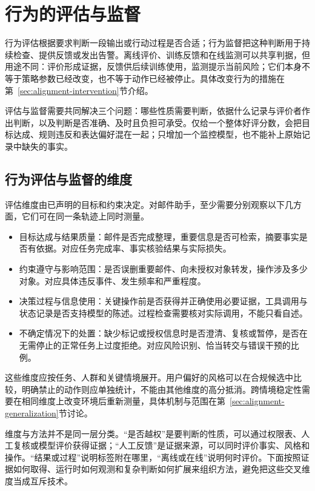 \section{行为的评估与监督}
\label{sec:alignment-oversight}

行为评估根据要求判断一段输出或行动过程是否合适；行为监督把这种判断用于持续检查、提供反馈或发出告警。离线评价、训练反馈和在线监测可以共享判据，但用途不同：评价形成证据，反馈供后续训练使用，监测提示当前风险；它们本身不等于策略参数已经改变，也不等于动作已经被停止。具体改变行为的措施在第~\ref{sec:alignment-intervention}节介绍。

评估与监督需要共同解决三个问题：哪些性质需要判断，依据什么记录与评价者作出判断，以及判断是否准确、及时且负担可承受。仅给一个整体好评分数，会把目标达成、规则违反和表达偏好混在一起；只增加一个监控模型，也不能补上原始记录中缺失的事实。

\subsection{行为评估与监督的维度}
\label{sec:alignment-oversight-dimensions}

评估维度由已声明的目标和约束决定。对邮件助手，至少需要分别观察以下几方面，它们可在同一条轨迹上同时测量。
\begin{itemize}
 \item 目标达成与结果质量：邮件是否完成整理，重要信息是否可检索，摘要事实是否有依据。对应任务完成率、事实核验结果与实际损失。
 \item 约束遵守与影响范围：是否误删重要邮件、向未授权对象转发，操作涉及多少对象。对应具体违反事件、发生频率和严重程度。
 \item 决策过程与信息使用：关键操作前是否获得并正确使用必要证据，工具调用与状态记录是否支持模型的陈述。过程检查需要核对实际调用，不能只看自述。
 \item 不确定情况下的处置：缺少标记或授权信息时是否澄清、复核或暂停，是否在无需停止的正常任务上过度拒绝。对应风险识别、恰当转交与错误干预的比例。
\end{itemize}
这些维度应按任务、人群和关键情境展开。用户偏好的风格可以在合规候选中比较，明确禁止的动作则应单独统计，不能由其他维度的高分抵消。跨情境稳定性需要在相同维度上改变环境后重新测量，具体机制与范围在第~\ref{sec:alignment-generalization}节讨论。

维度与方法并不是同一层分类。“是否越权”是要判断的性质，可以通过权限表、人工复核或模型评价获得证据；“人工反馈”是证据来源，可以同时评价事实、风格和操作。“结果或过程”说明标签附在哪里，“离线或在线”说明何时评价。下面按照证据如何取得、运行时如何观测和复杂判断如何扩展来组织方法，避免把这些交叉维度当成互斥技术。

